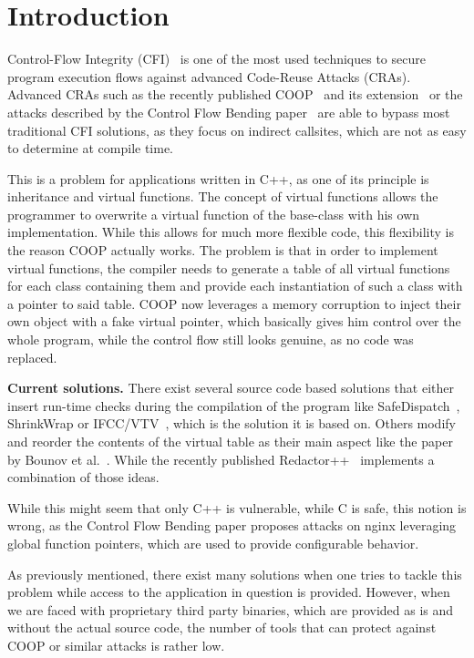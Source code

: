 \section{Introduction}
\label{chapter:Introduction}

Control-Flow Integrity (CFI)~\cite{abadi:cfi2, abadi:cfi} is one of the most used techniques to secure program execution 
flows against advanced Code-Reuse Attacks (CRAs). Advanced CRAs such as the recently published COOP~\cite{schuster:coop} 
and its extension~\cite{crane:readactor++} or the attacks described by the Control Flow Bending paper~\cite{carlini:bending}
are able to bypass most traditional CFI solutions, as they focus on indirect callsites, which are not as easy to determine at compile time.

This is a problem for applications written in C++, as one of its principle is inheritance and virtual functions. 
The concept of virtual functions allows the programmer to overwrite a virtual function of the base-class with his
own implementation. While this allows for much more flexible code, this flexibility is the reason COOP actually 
works. The problem is that in order to implement virtual functions, the compiler needs to generate a table of all
virtual functions for each class containing them and provide each instantiation of such a class with a pointer
to said table. COOP now leverages a memory corruption to inject their own object with a fake virtual pointer, 
which basically gives him control over the whole program, while the control flow still looks genuine, as no 
code was replaced. 

\textbf{Current solutions.} There exist several source code based solutions that either insert run-time checks during the compilation of 
the program like SafeDispatch~\cite{safedispatch:jang}, ShrinkWrap \cite{haller:shrinkwrap} or IFCC/VTV~\cite{vtv:tice}, 
which is the solution it is based on. Others modify and reorder the contents of the virtual table as their main 
aspect like the paper by Bounov et al.~\cite{bounov:interleaving}. While the recently published Redactor++~\cite{crane:readactor++}
implements a combination of those ideas.

While this might seem that only C++ is vulnerable, while C is safe, this notion is wrong, as the 
Control Flow Bending paper \cite{carlini:bending} proposes attacks on nginx leveraging global 
function pointers, which are used to provide configurable behavior.

As previously mentioned, there exist many solutions when one tries to tackle this problem while access
to the application in question is provided. However, when we are faced with proprietary third party 
binaries, which are provided as is and without the actual source code, the number of tools that can
protect against COOP or similar attacks is rather low.

